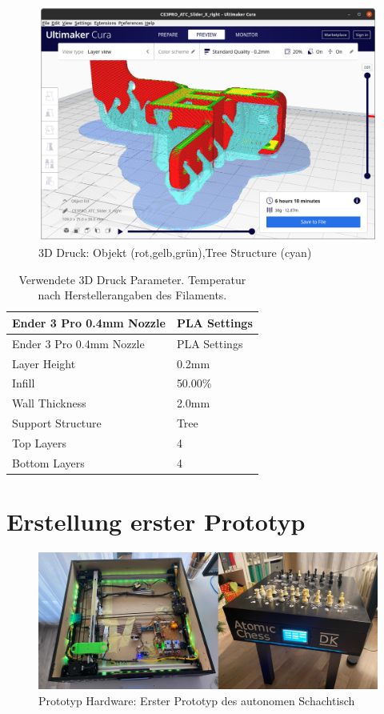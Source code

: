 \begin{figure}
\centering
\includegraphics{images/3d_print_tree_structure.png}
\caption{3D Druck: Objekt (rot,gelb,grün),Tree Structure (cyan)}
\end{figure}

\begin{longtable}[]{@{}ll@{}}
\caption{Verwendete 3D Druck Parameter. Temperatur nach
Herstellerangaben des Filaments.}\tabularnewline
\toprule
Ender 3 Pro 0.4mm Nozzle & PLA Settings\tabularnewline
\midrule
\endfirsthead
\toprule
Ender 3 Pro 0.4mm Nozzle & PLA Settings\tabularnewline
\midrule
\endhead
Layer Height & 0.2mm\tabularnewline
Infill & 50.00\%\tabularnewline
Wall Thickness & 2.0mm\tabularnewline
Support Structure & Tree\tabularnewline
Top Layers & 4\tabularnewline
Bottom Layers & 4\tabularnewline
\bottomrule
\end{longtable}

\hypertarget{erstellung-erster-prototyp}{%
\section{Erstellung erster Prototyp}\label{erstellung-erster-prototyp}}

\begin{figure}
\centering
\includegraphics{images/table_images/dk.png}
\caption{Prototyp Hardware: Erster Prototyp des autonomen Schachtisch}
\end{figure}

